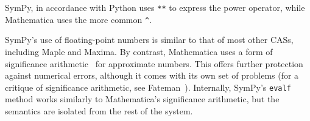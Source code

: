 
SymPy, in accordance with Python uses \texttt{**} to express the power
operator, while Mathematica uses the more common \verb|^|.


SymPy's use of floating-point numbers is similar to that of most
other CASs, including Maple and Maxima.
By contrast, Mathematica uses a form
of significance arithmetic~\cite{Sofroniou2005precise} for approximate numbers.
This offers further protection against numerical errors,
although it comes with its own set of problems
(for a critique of significance arithmetic, see Fateman~\cite{Fateman1992}).
Internally, SymPy's \texttt{evalf} method works similarly to Mathematica's
significance arithmetic, but the semantics are isolated from the rest of the system.
